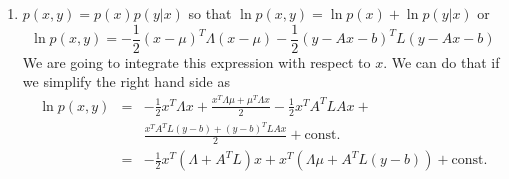 \begin{enumerate}
\item $p(x, y) = p(x)p(y|x)$ so that $\ln p(x, y) = \ln p(x) + \ln p(y|x)$ or
\[
\ln p(x, y) = -\frac{1}{2}(x - \mu)^T\Lambda(x - \mu) - \frac{1}{2}(y - Ax - b)^T L (y - Ax - b)
\]
We are going to integrate this expression with respect to $x$. We can do that if we simplify
the right hand side as
\begin{eqnarray*}
\ln p(x,y) &=& -\frac{1}{2}x^T\Lambda x + \frac{x^T\Lambda\mu + \mu^T\Lambda x}{2} - \frac{1}{2}x^TA^T L A x + \\
 & & \frac{x^TA^TL(y-b)+(y-b)^TLAx}{2} + \mathrm{const.} \\
 &=& -\frac{1}{2}x^T(\Lambda + A^TL)x + x^T(\Lambda\mu + A^TL(y - b)) + \mathrm{const.}
\end{eqnarray*}
\end{enumerate}
